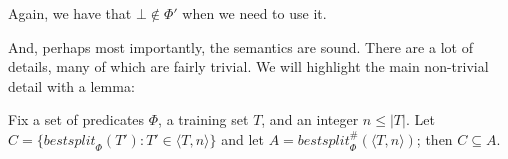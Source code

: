 Again, we have that $\bot \not \in \Phi'$ when we need to use it.
\begin{proposition}[todo]
\end{proposition}

And, perhaps most importantly, the semantics are sound.
There are a lot of details, many of which are fairly trivial.
We will highlight the main non-trivial detail with a lemma:
\begin{lemma}
Fix a set of predicates $\Phi$, a training set $T$, and an integer $n \leq |T|$.
Let $C = \{\mathit{bestsplit}_\Phi(T') : T' \in \langle T, n \rangle\}$
and let $A = \mathit{bestsplit}^\#_\Phi(\langle T, n \rangle)$;
then $C \subseteq A$.
\end{lemma}
